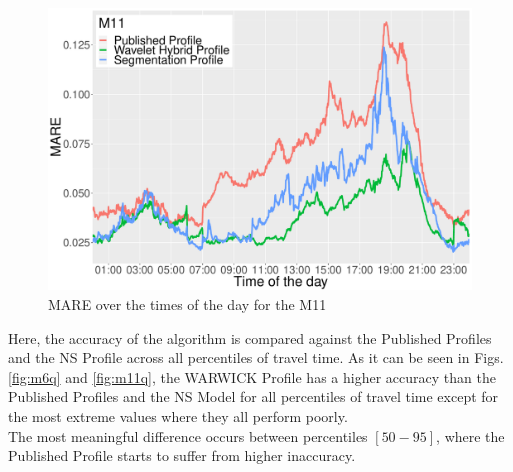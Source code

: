\documentclass[letterpaper, 10 pt, conference]{ieeeconf}  %
\begin{document}
\begin{figure}[htbp]
	\centerline{\includegraphics[width=\linewidth]{./images/M11_daytime_8_12.pdf}}
	\caption{MARE over the times of the day for the M11}
	\label{fig:m11dt}
\end{figure}


Here, the accuracy of the algorithm is compared against the Published Profiles and the NS Profile across all percentiles of travel time.
As it can be seen in Figs. \ref{fig:m6q} and \ref{fig:m11q}, the WARWICK Profile has a higher accuracy than the Published Profiles and the NS Model for all percentiles of travel time except for the most extreme values where they all perform poorly.\\
The most meaningful difference occurs between percentiles $[50-95]$, where the Published Profile starts to suffer from higher inaccuracy.
\end{document}
